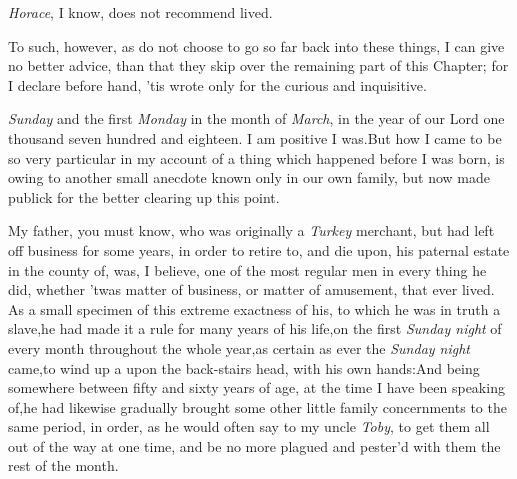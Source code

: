 \documentclass{article}
\begin{document}
\textit{Horace}, I know, does not recommend 
lived.

To such, however, as do not choose to 
go so far back into these things, I can\break
give no better advice, than that they\break
skip over the remaining part of this\break 
Chapter; for I declare before hand, ’tis
wrote only for the curious and inquisitive.

\noindent
{}\break
{}
\textit{Sunday} and the first
\textit{Monday} in the month of \textit{March}, in the year of our Lord one thousand
seven hundred and eighteen.\break
I am positive I was.\tsk But how I came to be so very
particular in my account of a thing which happened before I was born, is owing to
another small anecdote known only in our own family, but now made publick for the
better clearing up this point.

My father, you must know, who was originally a \textit{Turkey}
merchant, but had left off business for some years, in order to
retire to, and die upon, his paternal estate in the county of\tsh, 
was, I believe, one of the most regular men in
every thing he did, whether ’twas matter of business, or
matter of amusement, that ever lived. As a small specimen of this
extreme exactness of his, to which he was in truth a slave,\tsk he had
made it a rule for many years of his life,\tsk on the first
\textit{Sunday night} of every month throughout the whole
year,\tsk as certain as ever the \textit{Sunday night}
came,\tsk to wind up a 
upon the back-stairs head, with his own hands:\tsk And being
somewhere between fifty and sixty years of age, at the time I
have been speaking of,\tsk he had likewise gradually
brought some other little family concernments to the same period,
in order, as he would often say to my uncle \textit{Toby}, to get
them all out of the way at one time, and be no more plagued
and pester’d with them the rest of the month.
\end{document}
